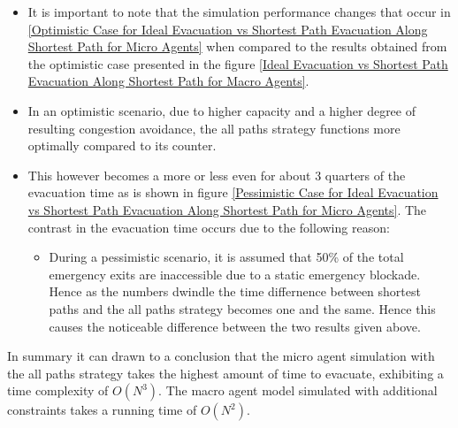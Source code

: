 \begin{itemize}
  \item It is important to note that the simulation performance changes that occur in \ref{Optimistic Case for Ideal Evacuation vs Shortest Path Evacuation Along Shortest Path for Micro Agents} when compared to the results obtained from the optimistic case presented in the figure \ref{Ideal Evacuation vs Shortest Path Evacuation Along Shortest Path for Macro Agents}.
  \item In an optimistic scenario, due to higher capacity and a higher degree of resulting congestion avoidance, the all paths strategy functions more optimally compared to its counter.
  \item This however becomes a more or less even for about 3 quarters of the evacuation time as is shown in figure \ref{Pessimistic Case for Ideal Evacuation vs Shortest Path Evacuation Along Shortest Path for Micro Agents}. The contrast in the evacuation time occurs due to the following reason:
    \begin{itemize}
      \item During a pessimistic scenario, it is assumed that 50\% of the total emergency exits are inaccessible due to a static emergency blockade. Hence as the numbers dwindle the time differnence between shortest paths and the all paths strategy becomes one and the same. Hence this causes the noticeable difference between the two results given above. 
    \end{itemize}
\end{itemize}

In summary it can drawn to a conclusion that the micro agent simulation with the all paths strategy takes the highest amount of time to evacuate, exhibiting a time complexity of $O(N^3)$. The macro agent model simulated with additional constraints takes a running time of $O(N^2)$.
